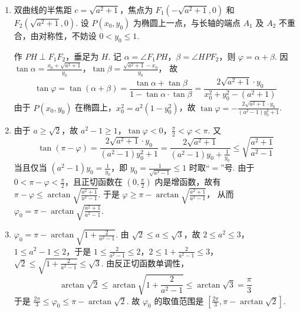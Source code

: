 \begin{solution}
\begin{enumerate}
\item 双曲线的半焦距 \(c = \sqrt{a^2 + 1}\)，焦点为 \(F_1(-\sqrt{a^2 + 1},0)\) 和 \(F_2(\sqrt{a^2 + 1},0)\). 设 \(P(x_0,y_0)\) 为椭圆上一点，与长轴的端点 \(A_1\) 及 \(A_2\) 不重合，由对称性，不妨设 \(0 < y_0 \leqslant 1\).

作 \(PH \perp F_1F_2\)，垂足为 \(H\). 记 \(\alpha = \angle F_1PH\)，\(\beta = \angle HPF_2\)，则 \(\varphi = \alpha + \beta\). 因 \(\tan \alpha = \frac{x_0 + \sqrt{a^2 + 1}}{y_0}\)，\(\tan \beta = \frac{\sqrt{a^2 + 1} - x_0}{y_0}\)，
故
\[
\tan \varphi
= \tan(\alpha + \beta)
= \frac{\tan \alpha + \tan \beta}{1 - \tan \alpha \cdot \tan \beta}
= \frac{2\sqrt{a^2 + 1} \cdot y_0}{x_0^2 + y_0^2 - (a^2 + 1)}
\]
由于 \(P(x_0,y_0)\) 在椭圆上，\(x_0^2 = a^2(1 - y_0^2)\)，故 \(\tan \varphi = -\frac{2\sqrt{a^2 + 1} \cdot y_0}{(a^2 - 1)y_0^2 + 1}\).

\item 由于 \(a \geqslant \sqrt{2}\)，故 \(a^2 - 1 \geqslant 1\)，\(\tan \varphi < 0\)，\(\frac{\pi}{2} < \varphi < \pi\). 又
\[
\tan(\pi - \varphi)
= \frac{2\sqrt{a^2 + 1} \cdot y_0}{(a^2 - 1)y_0^2 + 1}
= \frac{2\sqrt{a^2 + 1}}{(a^2 - 1)y_0 + \frac{1}{y_0}}
\leqslant \sqrt{\frac{a^2 + 1}{a^2 - 1}}
\]
当且仅当 \((a^2 - 1)y_0 = \frac{1}{y_0}\)，即 \(y_0 = \frac{1}{\sqrt{a^2 - 1}} \leqslant 1\) 时取“\(=\)”号. 由于 \(0 < \pi - \varphi < \frac{\pi}{2}\)，且正切函数在 \(\left(0,\frac{\pi}{2}\right)\) 内是增函数，故有 \(\pi - \varphi \leqslant \arctan\sqrt{\frac{a^2 + 1}{a^2 - 1}}\).
于是 \(\varphi \geqslant \pi - \arctan\sqrt{\frac{a^2 + 1}{a^2 - 1}}\)，
从而 \(\varphi_0 = \pi - \arctan\sqrt{\frac{a^2 + 1}{a^2 - 1}}\).

\item \(\varphi_0 = \pi - \arctan\sqrt{1 + \frac{2}{a^2 - 1}}\). 由 \(\sqrt{2} \leqslant a \leqslant \sqrt{3}\)，故 \(2 \leqslant a^2 \leqslant 3\)，\(1 \leqslant a^2 - 1 \leqslant 2\)，于是
\(1 \leqslant \frac{2}{a^2 - 1} \leqslant 2\)，\(2 \leqslant 1 + \frac{2}{a^2 - 1} \leqslant 3\)，
\(\sqrt{2} \leqslant \sqrt{1 + \frac{2}{a^2 - 1}} \leqslant \sqrt{3}\).
由反正切函数单调性，
\[
\arctan\sqrt{2} \leqslant \arctan\sqrt{1 + \frac{2}{a^2 - 1}} \leqslant \arctan\sqrt{3} = \frac{\pi}{3}
\]
于是 \(\frac{2\pi}{3} \leqslant \varphi_0 \leqslant \pi - \arctan\sqrt{2}\).
故 \(\varphi_0\) 的取值范围是 \(\left[\frac{2\pi}{3}, \pi - \arctan\sqrt{2}\right]\).

\end{enumerate}
\end{solution}
